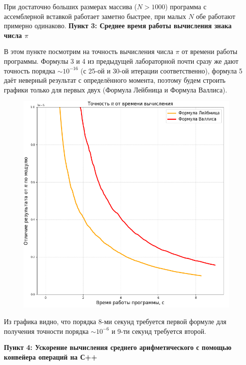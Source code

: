 \documentclass[a4paper,12pt]{article}
\begin{document}
При достаточно больших размерах массива ($N > 1000$) программа с ассемблерной вставкой работает заметно быстрее, при малых $N$ обе работают примерно одинаково.\newpage
\textbf{Пункт 3: Среднее время работы вычисления знака числа $\pi$}

В этом пункте посмотрим на точность вычисления числа $\pi$ от времени работы программы. Формулы 3 и 4 из предыдущей лабораторной почти сразу же дают точность порядка $\sim 10^{-16}$ (с 25-ой и 30-ой итерации соответственно), формула 5 даёт неверный результат с определённого момента, поэтому будем строить графики только для первых двух (Формула Лейбница и Формула Валлиса).    
\begin{figure}[H]\label{fig: Pi_1and2_Accuracy(time)}
    \centering
    \includegraphics[width = \textwidth]{Pi_1and2_Accuracy(time).png}
\end{figure}
Из графика видно, что порядка 8-ми секунд требуется первой формуле для получения точности порядка $\sim 10^{-6}$ и 9-ти секунд требуется второй.

\textbf{Пункт 4: Ускорение вычисления среднего арифметического с помощью конвейера операций на С++}
\end{document}
